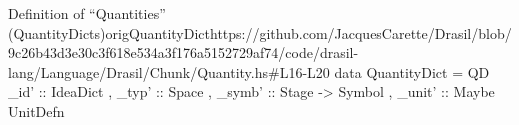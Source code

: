 \begin{haskell}{Definition of ``Quantities'' (QuantityDicts)}{origQuantityDict}{https://github.com/JacquesCarette/Drasil/blob/9c26b43d3e30c3f618e534a3f176a5152729af74/code/drasil-lang/Language/Drasil/Chunk/Quantity.hs\#L16-L20}
data QuantityDict = QD { _id' :: IdeaDict
                       , _typ' :: Space
                       , _symb' :: Stage -> Symbol
                       , _unit' :: Maybe UnitDefn
                       }
\end{haskell}
